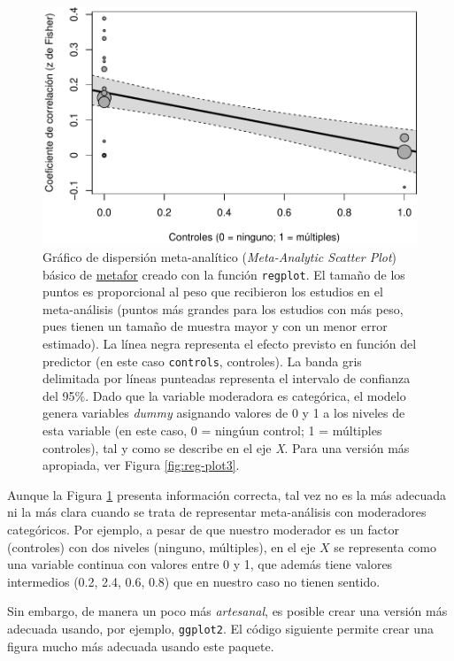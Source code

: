 \documentclass[
  bookmarksnumbered]{article}
\begin{document}
\begin{figure}
\centering
\includegraphics{Meta-analysis_files/figure-latex/reg-plot2-1.pdf}
\caption{\label{fig:reg-plot2}Gráfico de dispersión meta-analítico (\emph{Meta-Analytic Scatter Plot}) básico de \href{https://www.metafor-project.org/doku.php}{metafor} creado con la función \texttt{regplot}. El tamaño de los puntos es proporcional al peso que recibieron los estudios en el meta-análisis (puntos más grandes para los estudios con más peso, pues tienen un tamaño de muestra mayor y con un menor error estimado). La línea negra representa el efecto previsto en función del predictor (en este caso \texttt{controls}, controles). La banda gris delimitada por líneas punteadas representa el intervalo de confianza del 95\%. Dado que la variable moderadora es categórica, el modelo genera variables \emph{dummy} asignando valores de 0 y 1 a los niveles de esta variable (en este caso, 0 = ningúun control; 1 = múltiples controles), tal y como se describe en el eje \emph{X}. Para una versión más apropiada, ver Figura \ref{fig:reg-plot3}.}
\end{figure}

Aunque la Figura \ref{fig:reg-plot2} presenta información correcta, tal vez no es la más adecuada ni la más clara cuando se trata de representar meta-análisis con moderadores categóricos. Por ejemplo, a pesar de que nuestro moderador es un factor (controles) con dos niveles (ninguno, múltiples), en el eje \(X\) se representa como una variable continua con valores entre 0 y 1, que además tiene valores intermedios (0.2, 2.4, 0.6, 0.8) que en nuestro caso no tienen sentido.

Sin embargo, de manera un poco más \emph{artesanal}, es posible crear una versión más adecuada usando, por ejemplo, \texttt{ggplot2}. El código siguiente permite crear una figura mucho más adecuada usando este paquete.
\end{document}
